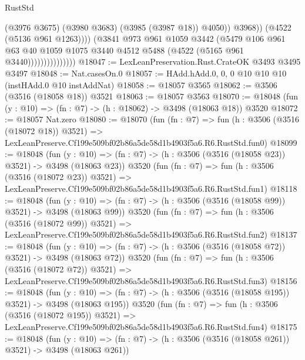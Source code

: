 \begin{lexlean}{RustStd}
\begin{coremodule}
                                      (@3976 @3675)
                                      (@3980 @3683)
                                      (@3985 (@3987 @18))
                                      @4050))
                                  @3968))
                              (@4522 (@5136 @961 @1263))))
                          (@3841
                            @973
                            @961
                            @1059
                            @3442
                            (@5479
                              @106
                              @961
                              @63
                              @40
                              @1059
                              @1075
                              @3440
                              @4512
                              @5488
                              (@4522 (@5165 @961 @3440)))))))))))))))
@18047 := LexLeanPreservation.Rust.CrateOK @3493 @3495 @3497
@18048 := Nat.casesOn.{0}
@18057 := HAdd.hAdd.{0, 0, 0} @10 @10 @10 (instHAdd.{0} @10 instAddNat)
@18058 := @18057 @3565
@18062 := @3506 (@3516 (@18058 @18)) @3521
@18063 := @18057 @3563
@18070 := @18048 (fun (y : @10) => (fn : @7) -> (h : @18062) -> @3498 (@18063 @18)) @3520
@18072 := @18057 Nat.zero
@18080 := @18070
    (fun (fn : @7) =>
    fun (h : @3506 (@3516 (@18072 @18)) @3521) =>
    LexLeanPreserve.Cf199e509bf02b86a5de58d1b4903f5a6.R6.RustStd.fun0)
@18099 := @18048
    (fun (y : @10) => (fn : @7) -> (h : @3506 (@3516 (@18058 @23)) @3521) -> @3498 (@18063 @23))
    @3520
    (fun (fn : @7) =>
    fun (h : @3506 (@3516 (@18072 @23)) @3521) =>
    LexLeanPreserve.Cf199e509bf02b86a5de58d1b4903f5a6.R6.RustStd.fun1)
@18118 := @18048
    (fun (y : @10) => (fn : @7) -> (h : @3506 (@3516 (@18058 @99)) @3521) -> @3498 (@18063 @99))
    @3520
    (fun (fn : @7) =>
    fun (h : @3506 (@3516 (@18072 @99)) @3521) =>
    LexLeanPreserve.Cf199e509bf02b86a5de58d1b4903f5a6.R6.RustStd.fun2)
@18137 := @18048
    (fun (y : @10) => (fn : @7) -> (h : @3506 (@3516 (@18058 @72)) @3521) -> @3498 (@18063 @72))
    @3520
    (fun (fn : @7) =>
    fun (h : @3506 (@3516 (@18072 @72)) @3521) =>
    LexLeanPreserve.Cf199e509bf02b86a5de58d1b4903f5a6.R6.RustStd.fun3)
@18156 := @18048
    (fun (y : @10) => (fn : @7) -> (h : @3506 (@3516 (@18058 @195)) @3521) -> @3498 (@18063 @195))
    @3520
    (fun (fn : @7) =>
    fun (h : @3506 (@3516 (@18072 @195)) @3521) =>
    LexLeanPreserve.Cf199e509bf02b86a5de58d1b4903f5a6.R6.RustStd.fun4)
@18175 := @18048
    (fun (y : @10) => (fn : @7) -> (h : @3506 (@3516 (@18058 @261)) @3521) -> @3498 (@18063 @261))

\end{coremodule}
\end{lexlean}
